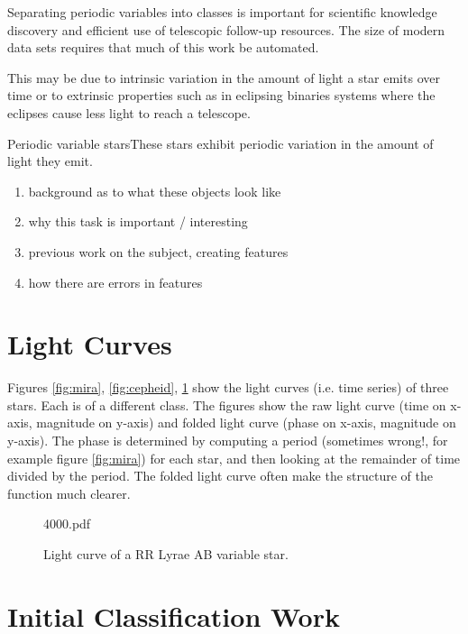\documentclass[11pt]{article}
\begin{document}
Separating periodic variables into classes is important for scientific knowledge discovery and efficient use of telescopic follow-up resources. The size of modern data sets requires that much of this work be automated. 


This may be due to intrinsic variation in the amount of light a star emits over time or to extrinsic properties such as in eclipsing binaries systems where the eclipses cause less light to reach a telescope.

Periodic variable starsThese stars exhibit periodic variation in the amount of light they emit.

\begin{enumerate}
\item background as to what these objects look like
\item why this task is important / interesting
\item previous work on the subject, creating features
\item how there are errors in features
\end{enumerate}

\section{Light Curves}

Figures \ref{fig:mira}, \ref{fig:cepheid}, \ref{fig:rrlyrae} show the light curves (i.e. time series) of three stars. Each is of a different class. The figures show the raw light curve (time on x-axis, magnitude on y-axis) and folded light curve (phase on x-axis, magnitude on y-axis). The phase is determined by computing a period (sometimes wrong!, for example figure \ref{fig:mira}) for each star, and then looking at the remainder of time divided by the period. The folded light curve often make the structure of the function much clearer.





\begin{figure}[h]
  \begin{center}
    \begin{includegraphics}[scale=.5]{4000.pdf}
      \caption{Light curve of a RR Lyrae AB variable star.\label{fig:rrlyrae}}
    \end{includegraphics}
  \end{center}
\end{figure}



\section{Initial Classification Work}
\end{document}
